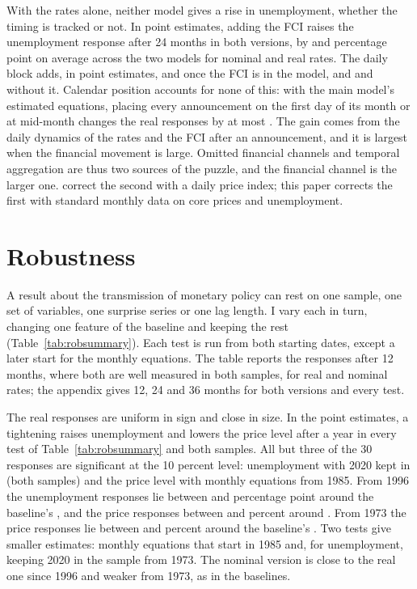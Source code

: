 \documentclass[11pt]{article}
\begin{document}


With the rates alone, neither model gives a rise in unemployment, whether the timing is tracked or not. In point estimates, adding the FCI raises the unemployment response after 24 months in both versions, by  and  percentage point on average across the two models for nominal and real rates. The daily block adds, in point estimates,  and  once the FCI is in the model, and  and  without it. Calendar position accounts for none of this: with the main model's estimated equations, placing every announcement on the first day of its month or at mid-month changes the real responses by at most . The gain comes from the daily dynamics of the rates and the FCI after an announcement, and it is largest when the financial movement is large. Omitted financial channels and temporal aggregation are thus two sources of the puzzle, and the financial channel is the larger one. \citet{jacobson2026} correct the second with a daily price index; this paper corrects the first with standard monthly data on core prices and unemployment.

\FloatBarrier
\section{Robustness}\label{sec:rob}
A result about the transmission of monetary policy can rest on one sample, one set of variables, one surprise series or one lag length. I vary each in turn, changing one feature of the baseline and keeping the rest (Table~\ref{tab:robsummary}). Each test is run from both starting dates, except a later start for the monthly equations. The table reports the responses after 12 months, where both are well measured in both samples, for real and nominal rates; the appendix gives 12, 24 and 36 months for both versions and every test.



The real responses are uniform in sign and close in size. In the point estimates, a tightening raises unemployment and lowers the price level after a year in every test of Table~\ref{tab:robsummary} and both samples. All but three of the 30 responses are significant at the 10 percent level: unemployment with 2020 kept in (both samples) and the price level with monthly equations from 1985. From 1996 the unemployment responses lie between  and  percentage point around the baseline's , and the price responses between  and  percent around . From 1973 the price responses lie between  and  percent around the baseline's . Two tests give smaller estimates: monthly equations that start in 1985 and, for unemployment, keeping 2020 in the sample from 1973. The nominal version is close to the real one since 1996 and weaker from 1973, as in the baselines.
\end{document}
